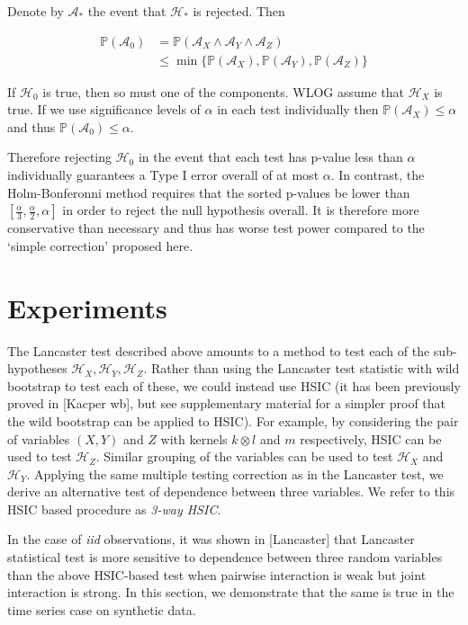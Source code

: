 \documentclass[]{article}
\begin{document}
Denote by $\mathcal{A}_*$ the event that $\mathcal{H}_*$ is rejected. Then

\begin{align*}
\mathbb{P}(\mathcal{A}_0) &= \mathbb{P}(\mathcal{A}_X \land \mathcal{A}_Y \land \mathcal{A}_Z) \\
&\leq \min\{\mathbb{P}(\mathcal{A}_X), \mathbb{P}(\mathcal{A}_Y), \mathbb{P}(\mathcal{A}_Z)\}
\end{align*}

If $\mathcal{H}_0$ is true, then so must one of the components. WLOG assume that $\mathcal{H}_X$ is true. If we use significance levels of $\alpha$ in each test individually then $\mathbb{P}(\mathcal{A}_X) \leq \alpha$ and thus $\mathbb{P}(\mathcal{A}_0) \leq \alpha$.

Therefore rejecting $\mathcal{H}_0$ in the event that each test has p-value less than $\alpha$ individually guarantees a Type I error overall of at most $\alpha$. In contrast, the Holm-Bonferonni method requires that the sorted p-values be lower than $[\frac{\alpha}{3},\frac{\alpha}{2},\alpha]$ in order to reject the null hypothesis overall. It is therefore more conservative than necessary and thus has worse test power compared to the `simple correction' proposed here.

\section{Experiments}

The Lancaster test described above amounts to a method to test each of the sub-hypotheses $\mathcal{H}_X, \mathcal{H}_Y, \mathcal{H}_Z$. Rather than using the Lancaster test statistic with wild bootstrap to test each of these, we could instead use HSIC (it has been previously proved in [Kacper wb], but see supplementary material for a simpler proof that the wild bootstrap can be applied to HSIC). For example, by considering the pair of variables $(X,Y)$ and $Z$ with kernels $k\otimes l$ and $m$ respectively, HSIC can be used to test $\mathcal{H}_Z$. Similar grouping of the variables can be used to test $\mathcal{H}_X$ and $\mathcal{H}_Y$. Applying the same multiple testing correction as in the Lancaster test, we derive an alternative test of dependence between three variables. We refer to this HSIC based procedure as \emph{3-way HSIC}.

In the case of \emph{iid} observations, it was shown in [Lancaster] that Lancaster statistical test is more sensitive to dependence between three random variables than the above HSIC-based test when pairwise interaction is weak but joint interaction is strong. In this section, we demonstrate that the same is true in the time series case on synthetic data.
\end{document}
